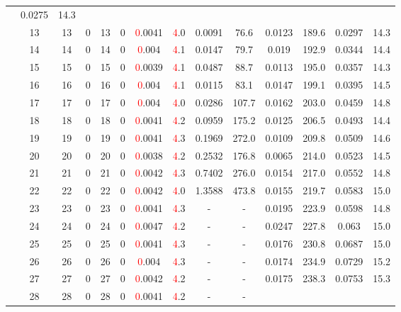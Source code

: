 \begin{table}[htb]
{\begin{tabular}{|c|c|c|c|c|c|c|c|c|c|c|c|c|c|}
 & 0.0275 & 14.3
 \\
 & 
13 & 13 & 0 & 13 & 0
 & \textcolor{red}0.0041 & \textcolor{red}4.0
 & 0.0091 & 76.6
 & 0.0123 & 189.6
 & 0.0297 & 14.3
 \\
 & 
14 & 14 & 0 & 14 & 0
 & \textcolor{red}0.004 & \textcolor{red}4.1
 & 0.0147 & 79.7
 & 0.019 & 192.9
 & 0.0344 & 14.4
 \\
 & 
15 & 15 & 0 & 15 & 0
 & \textcolor{red}0.0039 & \textcolor{red}4.1
 & 0.0487 & 88.7
 & 0.0113 & 195.0
 & 0.0357 & 14.3
 \\
 & 
16 & 16 & 0 & 16 & 0
 & \textcolor{red}0.004 & \textcolor{red}4.1
 & 0.0115 & 83.1
 & 0.0147 & 199.1
 & 0.0395 & 14.5
 \\
 & 
17 & 17 & 0 & 17 & 0
 & \textcolor{red}0.004 & \textcolor{red}4.0
 & 0.0286 & 107.7
 & 0.0162 & 203.0
 & 0.0459 & 14.8
 \\
 & 
18 & 18 & 0 & 18 & 0
 & \textcolor{red}0.0041 & \textcolor{red}4.2
 & 0.0959 & 175.2
 & 0.0125 & 206.5
 & 0.0493 & 14.4
 \\
 & 
19 & 19 & 0 & 19 & 0
 & \textcolor{red}0.0041 & \textcolor{red}4.3
 & 0.1969 & 272.0
 & 0.0109 & 209.8
 & 0.0509 & 14.6
 \\
 & 
20 & 20 & 0 & 20 & 0
 & \textcolor{red}0.0038 & \textcolor{red}4.2
 & 0.2532 & 176.8
 & 0.0065 & 214.0
 & 0.0523 & 14.5
 \\
 & 
21 & 21 & 0 & 21 & 0
 & \textcolor{red}0.0042 & \textcolor{red}4.3
 & 0.7402 & 276.0
 & 0.0154 & 217.0
 & 0.0552 & 14.8
 \\
 & 
22 & 22 & 0 & 22 & 0
 & \textcolor{red}0.0042 & \textcolor{red}4.0
 & 1.3588 & 473.8
 & 0.0155 & 219.7
 & 0.0583 & 15.0
 \\
 & 
23 & 23 & 0 & 23 & 0
 & \textcolor{red}0.0041 & \textcolor{red}4.3
 & - & -
 & 0.0195 & 223.9
 & 0.0598 & 14.8
 \\
 & 
24 & 24 & 0 & 24 & 0
 & \textcolor{red}0.0047 & \textcolor{red}4.2
 & - & -
 & 0.0247 & 227.8
 & 0.063 & 15.0
 \\
 & 
25 & 25 & 0 & 25 & 0
 & \textcolor{red}0.0041 & \textcolor{red}4.3
 & - & -
 & 0.0176 & 230.8
 & 0.0687 & 15.0
 \\
 & 
26 & 26 & 0 & 26 & 0
 & \textcolor{red}0.004 & \textcolor{red}4.3
 & - & -
 & 0.0174 & 234.9
 & 0.0729 & 15.2
 \\
 & 
27 & 27 & 0 & 27 & 0
 & \textcolor{red}0.0042 & \textcolor{red}4.2
 & - & -
 & 0.0175 & 238.3
 & 0.0753 & 15.3
 \\
 & 
28 & 28 & 0 & 28 & 0
 & \textcolor{red}0.0041 & \textcolor{red}4.2
 & - & -

\end{tabular}}
\end{table}
